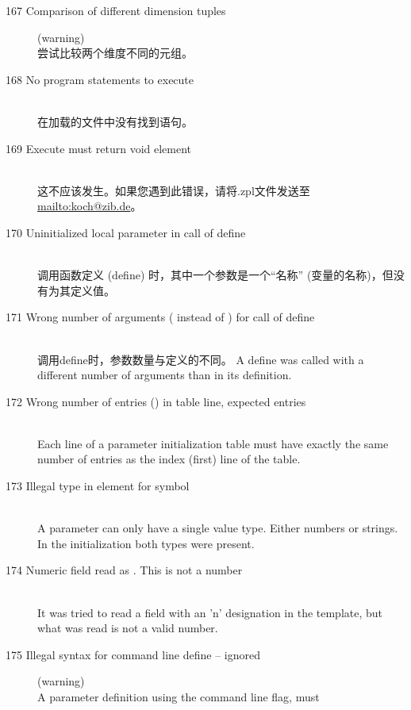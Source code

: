 \begin{description}
\item[167 Comparison of different dimension tuples] (warning)\ \\
  尝试比较两个维度不同的元组。
%
%
\item[168 No program statements to execute]\ \\
  在加载的文件中没有找到\zimpl 语句。
%
%
\item[169 Execute must return void element]\ \\
  这不应该发生。如果您遇到此错误，请将.zpl文件发送至\url{mailto:koch@zib.de}。
%
%
\item[170 Uninitialized local parameter  in call of
  define ]\ \\
  调用函数定义 (define) 时，其中一个参数是一个``名称''
  (变量的名称)，但没有为其定义值。
\item[171 Wrong number of arguments ( instead of )
  for call of define ]\ \\
  调用define时，参数数量与定义的不同。
  A define was called with a different number of arguments than in
  its definition.
\item[172 Wrong number of entries () in table line, 
  expected  entries]\ \\
  Each line of a parameter initialization table must have
  exactly the same number of entries as the index (first) line of
  the table.
\item[173 Illegal type in element  for symbol]\ \\
  A parameter can only have a single value type. Either numbers or
  strings. In the initialization both types were present.
%
%
\item[174 Numeric field  read as . This is not a
  number]\ \\
  It was tried to read a field with an 'n' designation in the template,
  but what was read is not a valid number.
%
%
\item[175 Illegal syntax for command line define  --
  ignored] (warning)\\
  A parameter definition using the command line  flag, must

\end{description}
